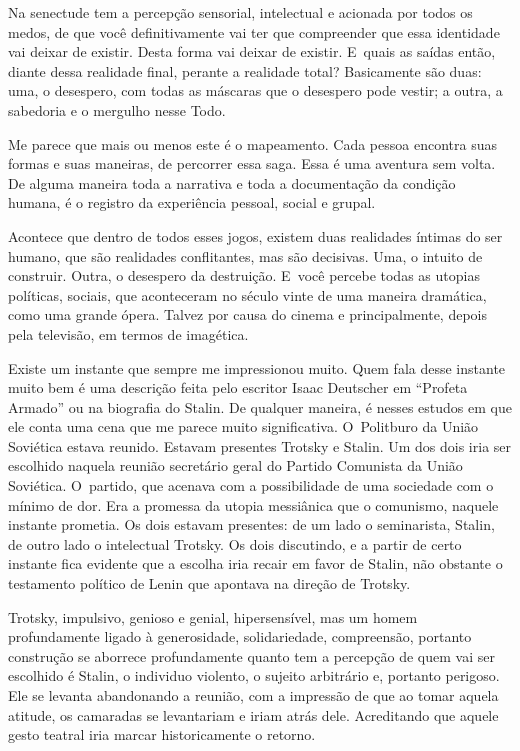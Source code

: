  

Na senectude tem a percepção sensorial, intelectual e acionada por todos
os medos, de que você definitivamente vai ter que compreender que essa
identidade vai deixar de existir. Desta forma vai deixar de existir. E~quais as saídas então, diante dessa realidade final, perante a realidade
total? Basicamente são duas: uma, o desespero, com todas as máscaras que
o desespero pode vestir; a outra, a sabedoria e o mergulho nesse Todo.

Me parece que mais ou menos este é o mapeamento. Cada pessoa encontra
suas formas e suas maneiras, de percorrer essa saga. Essa é uma aventura
sem volta. De alguma maneira toda a narrativa e toda a documentação da
condição humana, é o registro da experiência pessoal, social e grupal.

 

Acontece que dentro de todos esses jogos, existem duas realidades
íntimas do ser humano, que são realidades conflitantes, mas são
decisivas. Uma, o intuito de construir. Outra, o desespero da
destruição. E~você percebe todas as utopias políticas, sociais, que
aconteceram no século vinte de uma maneira dramática, como uma grande
ópera. Talvez por causa do cinema e principalmente, depois pela
televisão, em termos de imagética.

 

Existe um instante que sempre me impressionou muito. Quem fala desse
instante muito bem é uma descrição feita pelo escritor Isaac Deutscher
em ``Profeta Armado'' ou na biografia do Stalin. De qualquer maneira, é
nesses estudos em que ele conta uma cena que me parece muito
significativa. O~Politburo da União Soviética estava reunido. Estavam
presentes Trotsky e Stalin. Um dos dois iria ser escolhido naquela
reunião secretário geral do Partido Comunista da União Soviética. O~partido, que acenava com a possibilidade de uma sociedade com o mínimo
de dor. Era a promessa da utopia messiânica que o comunismo, naquele
instante prometia. Os dois estavam presentes: de um lado o seminarista,
Stalin, de outro lado o intelectual Trotsky. Os dois discutindo, e a
partir de certo instante fica evidente que a escolha iria recair em
favor de Stalin, não obstante o testamento político de Lenin que
apontava na direção de Trotsky.

 

Trotsky, impulsivo, genioso e genial, hipersensível, mas um homem
profundamente ligado à generosidade, solidariedade, compreensão,
portanto construção se aborrece profundamente quanto tem a percepção de
quem vai ser escolhido é Stalin, o individuo violento, o sujeito
arbitrário e, portanto perigoso. Ele se levanta abandonando a reunião,
com a impressão de que ao tomar aquela atitude, os camaradas se
levantariam e iriam atrás dele. Acreditando que aquele gesto teatral
iria marcar historicamente o retorno.

